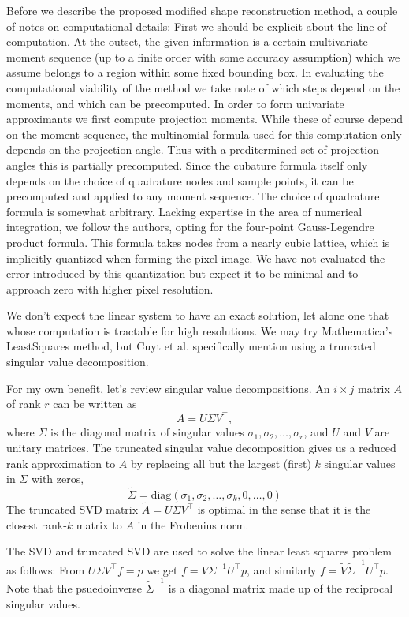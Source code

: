 \documentclass{amsart}
\theoremstyle{remark}
\numberwithin{equation}{section}
\begin{document}
Before we describe the proposed modified shape reconstruction method, a couple of notes on computational details: First we should be explicit about the line of computation. At the outset, the given information is a certain multivariate moment sequence (up to a finite order with some accuracy assumption) which we assume belongs to a region within some fixed bounding box. In evaluating the computational viability of the method we take note of which steps depend on the moments, and which can be precomputed. In order to form univariate approximants we first compute projection moments. While these of course depend on the moment sequence, the multinomial formula used for this computation only depends on the projection angle. Thus with a preditermined set of projection angles this is partially precomputed. Since the cubature formula itself only depends on the choice of quadrature nodes and sample points, it can be precomputed and applied to any moment sequence. The choice of quadrature formula is somewhat arbitrary. Lacking expertise in the area of numerical integration, we follow the authors, opting for the four-point Gauss-Legendre product formula. This formula takes nodes from a nearly cubic lattice, which is implicitly quantized when forming the pixel image. We have not evaluated the error introduced by this quantization but expect it to be minimal and to approach zero with higher pixel resolution.

We don't expect the linear system to have an exact solution, let alone one that whose computation is tractable for high resolutions. We may try Mathematica's LeastSquares method, but Cuyt et al. specifically mention using a truncated singular value decomposition.

For my own benefit, let's review singular value decompositions. An $i \times j$ matrix $A$ of rank $r$ can be written as 
\[
    A=U\Sigma V^\top,
\]
where $\Sigma$ is the diagonal matrix of singular values $\sigma_1, \sigma_2, \ldots, \sigma_r$, and $U$ and $V$ are unitary matrices. The truncated singular value decomposition gives us a reduced rank approximation to $A$ by replacing all but the largest (first) $k$ singular values in $\Sigma$ with zeros,
\[
    \tilde{\Sigma} = \text{diag}(\sigma_1, \sigma_2, \ldots, \sigma_k, 0, \ldots, 0)
\] 
The truncated SVD matrix $\tilde{A} = U \tilde{\Sigma} V^\top$ is optimal in the sense that it is the closest rank-$k$ matrix to $A$ in the Frobenius norm.

The SVD and truncated SVD are used to solve the linear least squares problem as follows: From $U\Sigma V^\top f = p$ we get $f=V \Sigma^{-1} U^\top p$, and similarly $f = \tilde{V} \tilde{\Sigma}^{-1} U^\top p$. Note that the psuedoinverse $\tilde\Sigma^{-1}$ is a diagonal matrix made up of the reciprocal singular values.
\end{document}
